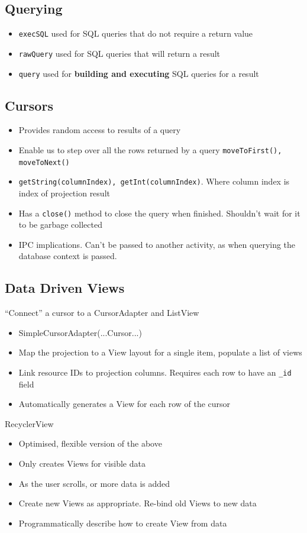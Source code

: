 \documentclass{article}
\begin{document}
\subsection{Querying}
\begin{itemize}
  \item \verb|execSQL| used for SQL queries that do not require a return value
  \item \verb|rawQuery| used for SQL queries that will return a result
  \item \verb|query| used for \textbf{building and executing} SQL queries for a result
\end{itemize}

\subsection{Cursors}

\begin{itemize}
  \item Provides random access to results of a query
  \item Enable us to step over all the rows returned by a query \verb|moveToFirst(), moveToNext()| 
  \item \verb|getString(columnIndex), getInt(columnIndex)|. Where column index is index of projection result 
  \item Has a \verb|close()| method to close the query when finished. Shouldn’t wait for it to be garbage collected 
  \item IPC implications. Can't be passed to another activity, as when querying the database context is passed.
\end{itemize}

\subsection{Data Driven Views}

\begin{flushleft}
“Connect” a cursor to a CursorAdapter and ListView
\begin{itemize}
  \item SimpleCursorAdapter(...Cursor...) 
  \item Map the projection to a View layout for a single item, populate a list of views 
  \item Link resource IDs to projection columns. Requires each row to have an \verb|_id| field 
  \item Automatically generates a View for each row of the cursor
\end{itemize}
RecyclerView
\begin{itemize}
  \item Optimised, flexible version of the above 
  \item Only creates Views for visible data 
  \item As the user scrolls, or more data is added 
  \item Create new Views as appropriate. Re-bind old Views to new data 
  \item Programmatically describe how to create View from data
\end{itemize}
\end{flushleft}
\end{document}
